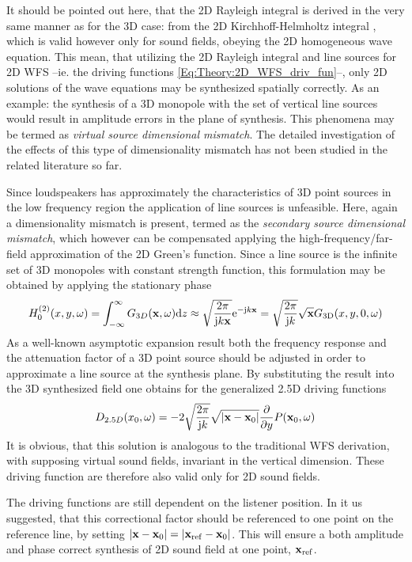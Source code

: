 It should be pointed out here, that the 2D Rayleigh integral is derived in the very same manner as for the 3D case: from the 2D Kirchhoff-Helmholtz integral \cite[Sect.8.6.2]{Williams1999}, which is valid however only for sound fields, obeying the 2D homogeneous wave equation. This mean, that utilizing the 2D Rayleigh integral and line sources for 2D WFS --ie. the driving functions \eqref{Eq:Theory:2D_WFS_driv_fun}--, only 2D solutions of the wave equations may be synthesized spatially correctly. As an example: the synthesis of a 3D monopole with the set of vertical line sources would result in amplitude errors in the plane of synthesis. This phenomena may be termed as \emph{virtual source dimensional mismatch}. The detailed investigation of the effects of this type of dimensionality mismatch has not been studied in the related literature so far.

Since loudspeakers has approximately the characteristics of 3D point sources in the low frequency region the application of line sources is unfeasible. 
Here, again a dimensionality mismatch is present, termed as the \emph{secondary source dimensional mismatch}, which however can be compensated applying the high-frequency/far-field approximation of the 2D Green's function. Since a line source is the infinite set of 3D monopoles with constant strength function, this formulation may be obtained by applying the stationary phase
\begin{equation}
H_0^{(2)}(x,y,\omega) = \int_{-\infty}^{\infty} G_{3D}( \mathbf{x}, \omega) \mathrm{d} z \approx \sqrt{\frac{2\pi}{\mathrm{j} k \mathbf{x}}}\mathrm{e}^{-\mathrm{j} k \mathbf{x}}
=
\sqrt{\frac{2\pi}{\mathrm{j} k}} \sqrt{\mathbf{x}} G_{\mathrm{3D}}(x,y,0,\omega)
\end{equation}
As a well-known asymptotic expansion result both the frequency response and the attenuation factor of a 3D point source should be adjusted in order to approximate a line source at the synthesis plane. By substituting the result into the 3D synthesized field one obtains for the generalized 2.5D driving functions
\begin{equation}
D_{2.5D}(x_0,\omega) =  -2\sqrt{\frac{2\pi}{\mathrm{j} k}}\sqrt{|\mathbf{x}-\mathbf{x}_0|} \frac{\partial}{\partial y} P(\mathbf{x}_0,\omega)
\end{equation}
It is obvious, that this solution is analogous to the traditional WFS derivation, with supposing virtual sound fields, invariant in the vertical dimension. These driving function are therefore also valid only for 2D sound fields.

The driving functions are still dependent on the listener position. 
In \cite{Spors2008:WFSrevisited} it us suggested, that this correctional factor should be referenced to one point on the reference line, by setting $|\mathbf{x} - \mathbf{x}_0| = |\mathbf{x}_{\mathrm{ref}}- \mathbf{x}_0|$. This will ensure a both amplitude and phase correct synthesis of 2D sound field at one point, $\mathbf{x}_{\mathrm{ref}}$.

